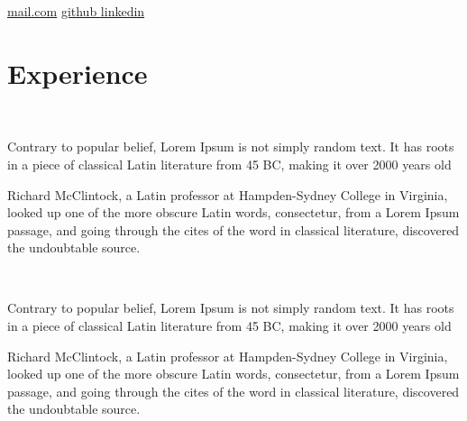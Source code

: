 \documentclass[]{charan}
\begin{document}
%
%
\lastupdated

%
%


{
	\faEnvelope \href{mailto:xyz@mail.com}{ mail.com}
	\faGithub \href{https://github.com/charansai612}{ github } 
	\faLinkedinSquare \href{https://www.linkedin.com/}{ linkedin}
}
\section{Experience}
 \\
\vspace{0.3em} %
\begin{tightemize}
\item Contrary to popular belief, Lorem Ipsum is not simply random text. It has roots in a piece of classical Latin literature from 45 BC, making it over 2000 years old
\item Richard McClintock, a Latin professor at Hampden-Sydney College in Virginia, looked up one of the more obscure Latin words, consectetur, from a Lorem Ipsum passage, and going through the cites of the word in classical literature, discovered the undoubtable source.
\end{tightemize}
\sectionsep

 \\
\vspace{0.3em} %
\begin{tightemize}
\item Contrary to popular belief, Lorem Ipsum is not simply random text. It has roots in a piece of classical Latin literature from 45 BC, making it over 2000 years old
\item Richard McClintock, a Latin professor at Hampden-Sydney College in Virginia, looked up one of the more obscure Latin words, consectetur, from a Lorem Ipsum passage, and going through the cites of the word in classical literature, discovered the undoubtable source.
\end{tightemize}
\sectionsep
\sectionsep

\end{document}
